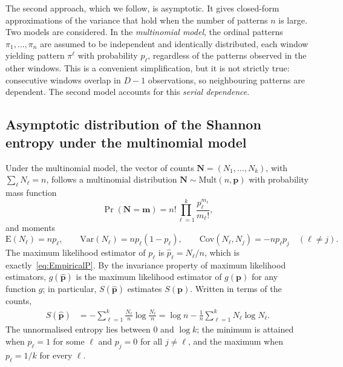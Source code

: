 The second approach, which we follow, is asymptotic. It gives closed-form approximations of the variance that hold when the number of patterns $n$ is large. Two models are considered. In the \emph{multinomial model}, the ordinal patterns $\pi_1,\dots,\pi_n$ are assumed to be independent and identically distributed, each window yielding pattern $\pi^\ell$ with probability $p_\ell$, regardless of the patterns observed in the other windows. This is a convenient simplification, but it is not strictly true: consecutive windows overlap in $D-1$ observations, so neighbouring patterns are dependent. The second model accounts for this \emph{serial dependence}.

\subsection{Asymptotic distribution of the Shannon entropy under the multinomial model}\label{Subsec:Multinomial}

Under the multinomial model, the vector of counts $\mathbf{N}=(N_1,\dots,N_k)$, with $\sum_{\ell}N_\ell=n$, follows a multinomial distribution $\mathbf{N}\sim\mathrm{Mult}(n,\mathbf{p})$ with probability mass function
\[
\Pr(\mathbf{N}=\mathbf{m})=n!\prod_{\ell=1}^{k}\frac{p_\ell^{m_\ell}}{m_\ell!},
\]
and moments
\[
\mathrm{E}(N_\ell)=np_\ell,\qquad
\mathrm{Var}(N_\ell)=np_\ell(1-p_\ell),\qquad
\mathrm{Cov}(N_\ell,N_j)=-np_\ell p_j \quad (\ell\neq j).
\]
The maximum likelihood estimator of $p_\ell$ is $\widehat{p}_\ell=N_\ell/n$, which is exactly~\eqref{eq:EmpiricalP}. By the invariance property of maximum likelihood estimators, $g(\widehat{\mathbf{p}})$ is the maximum likelihood estimator of $g(\mathbf{p})$ for any function $g$; in particular, $S(\widehat{\mathbf{p}})$ estimates $S(\mathbf{p})$. Written in terms of the counts,
\begin{align}
	S(\widehat{\mathbf{p}})
	&=-\sum_{\ell=1}^{k}\frac{N_\ell}{n}\log\frac{N_\ell}{n}
	=\log n-\frac{1}{n}\sum_{\ell=1}^{k}N_\ell\log N_\ell .
	\label{eq:AsymEntropy}
\end{align}
The unnormalised entropy lies between $0$ and $\log k$; the minimum is attained when $p_\ell=1$ for some $\ell$ and $p_j=0$ for all $j\neq\ell$, and the maximum when $p_\ell=1/k$ for every $\ell$.

